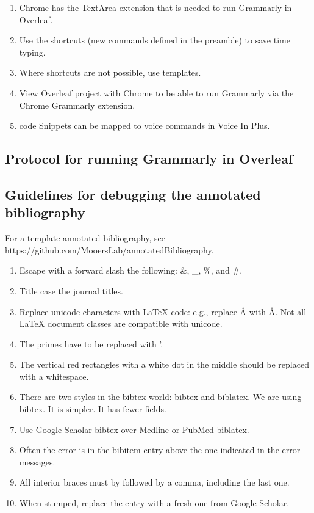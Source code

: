 \documentclass[10pt,letterpaper]{article}
\newcommand{\be}{\begin{enumerate}}
\newcommand{\ee}{\end{enumerate}}
\begin{document}
\be
\item Chrome has the TextArea extension that is needed to run Grammarly in Overleaf.
\item Use the shortcuts (new commands defined in the preamble) to save time typing.
\item Where shortcuts are not possible, use templates.
\item View Overleaf project with Chrome to be able to run Grammarly via the Chrome Grammarly extension.
\item code Snippets can be mapped to voice commands in Voice In Plus.
\ee 


\subsection{Protocol for running Grammarly in Overleaf}
\label{subsec:guides:grammarlyInoverleaf}



\subsection{Guidelines for debugging the annotated bibliography} 
\label{subsec:guides:annotDebug}

For a template annotated bibliography, see https://github.com/MooersLab/annotatedBibliography.

\be
\item Escape with a forward slash the following: \&, \_, \%, and \#. 
\item Title case the journal titles.
\item Replace unicode characters with LaTeX code: e.g., replace Å with \AA. Not all LaTeX document classes are compatible with unicode.
\item The primes have to be replaced with '.
\item The vertical red rectangles with a white dot in the middle should be replaced with a whitespace.
\item There are two styles in the bibtex world: bibtex and biblatex. We are using bibtex. It is simpler. It has fewer fields.
\item Use Google Scholar bibtex over Medline or PubMed biblatex. 
\item Often the error is in the bibitem entry above the one indicated in the error messages.
\item All interior braces must by followed by a comma, including the last one.
\item When stumped, replace the entry with a fresh one from Google Scholar.
\ee
\end{document}

